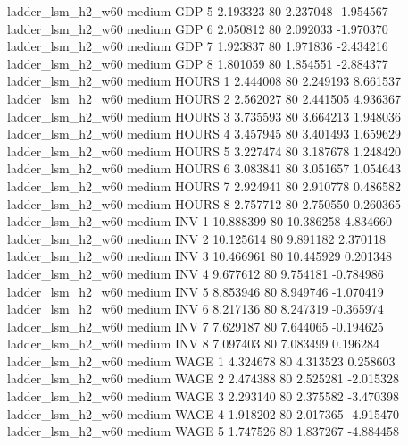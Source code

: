   ladder_lsm_h2_w60     medium      GDP                 5  2.193323 80       2.237048          -1.954567
  ladder_lsm_h2_w60     medium      GDP                 6  2.050812 80       2.092033          -1.970370
  ladder_lsm_h2_w60     medium      GDP                 7  1.923837 80       1.971836          -2.434216
  ladder_lsm_h2_w60     medium      GDP                 8  1.801059 80       1.854551          -2.884377
  ladder_lsm_h2_w60     medium    HOURS                 1  2.444008 80       2.249193           8.661537
  ladder_lsm_h2_w60     medium    HOURS                 2  2.562027 80       2.441505           4.936367
  ladder_lsm_h2_w60     medium    HOURS                 3  3.735593 80       3.664213           1.948036
  ladder_lsm_h2_w60     medium    HOURS                 4  3.457945 80       3.401493           1.659629
  ladder_lsm_h2_w60     medium    HOURS                 5  3.227474 80       3.187678           1.248420
  ladder_lsm_h2_w60     medium    HOURS                 6  3.083841 80       3.051657           1.054643
  ladder_lsm_h2_w60     medium    HOURS                 7  2.924941 80       2.910778           0.486582
  ladder_lsm_h2_w60     medium    HOURS                 8  2.757712 80       2.750550           0.260365
  ladder_lsm_h2_w60     medium      INV                 1 10.888399 80      10.386258           4.834660
  ladder_lsm_h2_w60     medium      INV                 2 10.125614 80       9.891182           2.370118
  ladder_lsm_h2_w60     medium      INV                 3 10.466961 80      10.445929           0.201348
  ladder_lsm_h2_w60     medium      INV                 4  9.677612 80       9.754181          -0.784986
  ladder_lsm_h2_w60     medium      INV                 5  8.853946 80       8.949746          -1.070419
  ladder_lsm_h2_w60     medium      INV                 6  8.217136 80       8.247319          -0.365974
  ladder_lsm_h2_w60     medium      INV                 7  7.629187 80       7.644065          -0.194625
  ladder_lsm_h2_w60     medium      INV                 8  7.097403 80       7.083499           0.196284
  ladder_lsm_h2_w60     medium     WAGE                 1  4.324678 80       4.313523           0.258603
  ladder_lsm_h2_w60     medium     WAGE                 2  2.474388 80       2.525281          -2.015328
  ladder_lsm_h2_w60     medium     WAGE                 3  2.293140 80       2.375582          -3.470398
  ladder_lsm_h2_w60     medium     WAGE                 4  1.918202 80       2.017365          -4.915470
  ladder_lsm_h2_w60     medium     WAGE                 5  1.747526 80       1.837267          -4.884458
